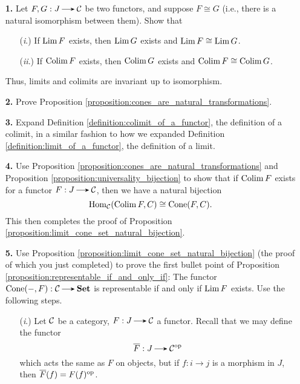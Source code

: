     \begin{itemize}
        \item[\textbf{1.}]
        Let $F, G: J \to \cc$ be two functors, and suppose $F \cong G$ (i.e., there is a
        natural isomorphism between them). 
        Show that 
        \begin{itemize}
            \item[(\emph{i}.)] If $\operatorname*{\mathrm{Lim }} F$ exists, then $\operatorname*{\mathrm{Lim }} G$ exists and $\operatorname*{\mathrm{Lim }} F \cong \operatorname*{\mathrm{Lim }} G$.
            \item[(\emph{ii}.)] If $\operatorname*{\mathrm{Colim }} F$ exists, then $\operatorname*{\mathrm{Colim }} G$ exists and $\operatorname*{\mathrm{Colim }} F \cong \operatorname*{\mathrm{Colim }} G$. 
        \end{itemize}
        Thus, limits and colimits are invariant up to isomorphism.


        \item[\textbf{2.}]
        Prove Proposition \ref{proposition:cones_are_natural_transformations}.
    
        \item[\textbf{3.}] Expand Definition \ref{definition:colimit_of_a_functor}, the definition of a colimit,
        in a similar fashion to how we expanded Definition \ref{definition:limit_of_a_functor}, the definition of a limit.

        \item[\textbf{4.}] Use Proposition \ref{proposition:cones_are_natural_transformations}
        and Proposition \ref{proposition:universality_bijection} to show that 
        if $\operatorname*{\mathrm{Colim }} F$ exists for a functor $F: J \to \cc$, then we have a natural bijection
        \[
            \operatorname{\mathrm{Hom}}_{\mathcal{C}}(\operatorname*{\mathrm{Colim }} F, C) \cong \operatorname{\mathrm{Cone}}(F, C).
        \]
        This then completes the proof of Proposition \ref{proposition:limit_cone_set_natural_bijection}.

        \item[\textbf{5.}]
        Use Proposition \ref{proposition:limit_cone_set_natural_bijection}
        (the proof of which you just completed) to prove the first bullet point of 
        Proposition \ref{proposition:representable_if_and_only_if}:
        The functor $\cone(-, F): \cc \to \textbf{Set}$ is representable if and only if 
        $\operatorname*{\mathrm{Lim }} F$ exists. Use the following steps. 

        \begin{itemize}
            \item[(\emph{i}.)]
            Let $\mathcal{C}$ be a category, $F: J \to \cc$ a functor. Recall that we 
            may define the functor 
            \[
                \overline{F}: J \to \cc\op
            \]
            which acts the same as $F$ on objects, but
            if $f: i \to j$ is a morphism in $J$, then $\overline{F}(f) = F(f)^{\mathrm{op}}$.


\end{itemize}
\end{itemize}
